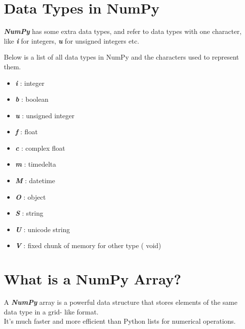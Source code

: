 \documentclass[11pt]{article}
\begin{document}
\section{\texorpdfstring{{Data Types in
NumPy}}{Data Types in NumPy}}\label{data-types-in-numpy}

\textbf{\emph{NumPy}} has some extra data types, and refer to data types
with one character, like \textbf{\emph{{i}}} for integers,
\textbf{\emph{{u}}} for unsigned integers etc.

Below is a list of all data types in NumPy and the characters used to
represent them.

\begin{itemize}
\item
  \textbf{\emph{{i}}} : integer
\item
  \textbf{\emph{{b}}} : boolean
\item
  \textbf{\emph{{u}}} : unsigned integer
\item
  \textbf{\emph{{f}}} : float
\item
  \textbf{\emph{{c}}} : complex float
\item
  \textbf{\emph{{m}}} : timedelta
\item
  \textbf{\emph{{M}}} : datetime
\item
  \textbf{\emph{{O}}} : object
\item
  \textbf{\emph{{S}}} : string
\item
  \textbf{\emph{{U}}} : unicode string
\item
  \textbf{\emph{{V}}} : fixed chunk of memory for other type ( void)
\end{itemize}

\section{\texorpdfstring{{What is a NumPy
Array?}}{What is a NumPy Array?}}\label{what-is-a-numpy-array}

A \textbf{\emph{NumPy}} array is a powerful data structure that stores
elements of the same data type in a grid- like format.\\
It's much faster and more efficient than Python lists for numerical
operations.
\end{document}
